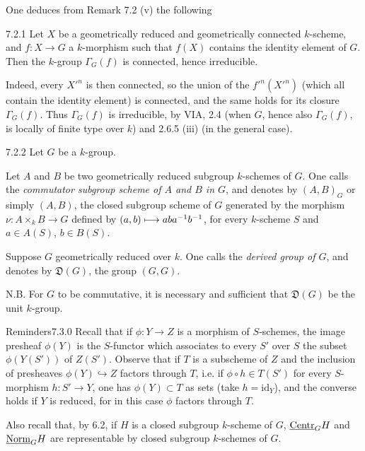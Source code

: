 One deduces from Remark 7.2 (v) the following
\begin{corollary}{7.2.1}\label{VIB.7.2.1}
Let $X$ be a geometrically reduced and geometrically connected $k$-scheme, and $f:X\to G$ a $k$-morphism such that $f(X)$ contains the identity element of $G$. Then the $k$-group $\Gamma_G(f)$ is connected, hence irreducible.
\end{corollary}
Indeed, every $X'^n$ is then connected, so the union of the $f'^n(X'^n)$ (which all contain the identity element) is connected, and the same holds for its closure $\Gamma_G(f)$. Thus $\Gamma_G(f)$ is irreducible, by VIA, 2.4 (when $G$, hence also $\Gamma_G(f)$, is locally of finite type over $k$) and 2.6.5 (iii) (in the general case).
\begin{definition}{7.2.2}\label{VIB.7.2.2}
Let $G$ be a $k$-group.
\begin{enumeratea}
\item Let $A$ and $B$ be two geometrically reduced subgroup $k$-schemes of $G$. One calls the \emph{commutator subgroup scheme of $A$ and $B$ in $G$}, and denotes by $(A,B)_G$ or simply $(A,B)$, the closed subgroup scheme of $G$ generated by the morphism $\nu:A\times_kB\to G$ defined by $(a,b)\longmapsto aba^{-1}b^{-1}$, for every $k$-scheme $S$ and $a\in A(S)$, $b\in B(S)$.
\item Suppose $G$ geometrically reduced over $k$. One calls the \emph{derived group of $G$}, and denotes by $\mathfrak D(G)$, the group $(G,G)$.
\end{enumeratea}
N.B. For $G$ to be commutative, it is necessary and sufficient that $\mathfrak D(G)$ be the unit $k$-group.
\end{definition}
\begin{enoncerm}{Reminders}{7.3.0}\label{VIB.7.3.0}
Recall that if $\phi:Y\to Z$ is a morphism of $S$-schemes, the image presheaf $\phi(Y)$ is the $S$-functor which associates to every $S'$ over $S$ the subset $\phi(Y(S'))$ of $Z(S')$. Observe that if $T$ is a subscheme of $Z$ and the inclusion of presheaves $\phi(Y)\hookrightarrow Z$ factors through $T$, i.e. if $\phi\circ h\in T(S')$ for every $S$-morphism $h:S'\to Y$, one has $\phi(Y)\subset T$ as sets (take $h=\mathrm{id}_Y$), and the converse holds if $Y$ is reduced, for in this case $\phi$ factors through $T$.

Also recall that, by 6.2, if $H$ is a closed subgroup $k$-scheme of $G$, $\underline{\mathrm{Centr}}_GH$ and $\underline{\mathrm{Norm}}_GH$ are representable by closed subgroup $k$-schemes of $G$.
\end{enoncerm}
